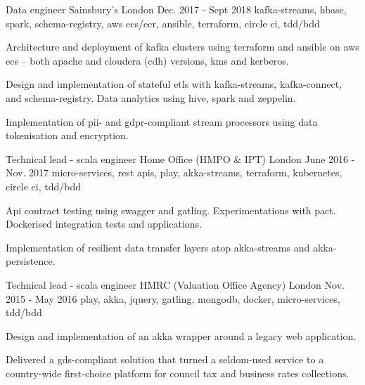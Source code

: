 \begin{cventries}
  \cventry
    {Data engineer} %
    {\hspace{0.5em}Sainsbury's} %
    {London} %
    {Dec. 2017 - Sept 2018} %
    {kafka-streams, hbase, spark, schema-registry, aws ecs/ecr, ansible, terraform, circle ci, tdd/bdd} %
    {
      \begin{cvitems} %
        \item {Architecture and deployment of kafka clusters using terraform and ansible on aws ecs -- both apache and cloudera (cdh) versions, kms and kerberos.}
        \item {Design and implementation of stateful etls with kafka-streams, kafka-connect, and schema-registry. Data analytics using hive, spark and zeppelin.}
        \item {Implementation of pii- and gdpr-compliant stream processors using data tokenisation and encryption.}
      \end{cvitems}
    }

  \cventry
    {Technical lead - scala engineer} %
    {\hspace{0.5em}Home Office (HMPO \& IPT)} %
    {London} %
    {June 2016 - Nov. 2017} %
    {micro-services, rest apis, play, akka-streams, terraform, kubernetes, circle ci, tdd/bdd} %
    {
      \begin{cvitems} %
        \item {Api contract testing using swagger and gatling. Experimentations with pact. Dockerised integration tests and applications.}
        \item {Implementation of resilient data transfer layers atop akka-streams and akka-persistence.}
      \end{cvitems}
    }

  \cventry
    {Technical lead - scala engineer} %
    {\hspace{0.5em}HMRC (Valuation Office Agency)} %
    {London} %
    {Nov. 2015 - May 2016} %
    {play, akka, jquery, gatling, mongodb, docker, micro-services, tdd/bdd} %
    {
      \begin{cvitems} %
        \item {Design and implementation of an akka wrapper around a legacy web application.}
        \item {Delivered a gds-compliant solution that turned a seldom-used service to a country-wide first-choice platform for council tax and business rates collections.}
      \end{cvitems}
    }


\end{cventries}
